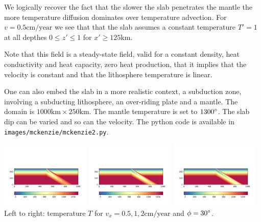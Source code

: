 We logically recover the fact that the slower the slab penetrates the mantle the more 
temperature diffusion dominates over temperature advection. For $v=0.5\text{cm/year}$ we see that 
that the slab assumes a constant temperature $T'=1$ at all depthes $0\leq z' \leq 1$ for 
$x'\geq 125\text{km}$. 

Note that this field is a steady-state field, valid for a constant density, heat conductivity and 
heat capacity, zero heat production, that it implies that the velocity is constant and that the 
lithosphere temperature is linear. 

One can also embed the slab in a more realistic context, a subduction zone, involving a 
subducting lithosphere, an over-riding plate and a mantle. The domain is $1000\text{km}\times 250\text{km}$.
The mantle temperature is set to $1300\degree$. The slab dip can be varied and so can the 
velocity. The python code is available in {\tt images/mckenzie/mckenzie2.py}.

\begin{center}
\includegraphics[width=0.32\textwidth]{images/mckenzie/temperature2_vel0p5_phi30.pdf}
\includegraphics[width=0.32\textwidth]{images/mckenzie/temperature2_vel1_phi30.pdf}
\includegraphics[width=0.32\textwidth]{images/mckenzie/temperature2_vel2_phi30.pdf}\\
{\small Left to right: temperature $T$ for $v_x={0.5,1,2}\text{cm/year}$ and $\phi=30\degree$.}
\end{center}

